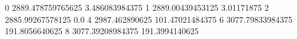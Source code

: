 0 2889.478759765625 3.486083984375
1 2889.00439453125 3.01171875
2 2885.99267578125 0.0
4 2987.462890625 101.47021484375
6 3077.79833984375 191.8056640625
8 3077.39208984375 191.3994140625
